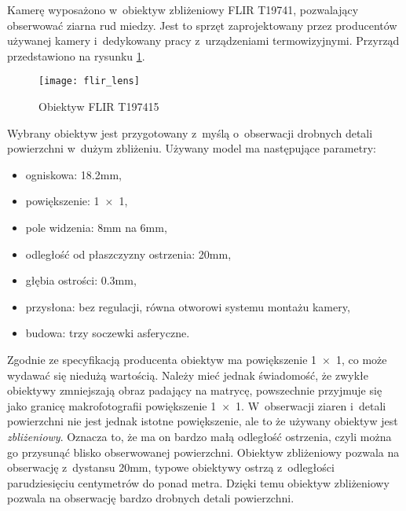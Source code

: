 Kamerę wyposażono w~obiektyw zbliżeniowy FLIR T19741, pozwalający obserwować
ziarna rud miedzy.
Jest to sprzęt zaprojektowany przez producentów używanej kamery i~dedykowany
pracy z~urządzeniami termowizyjnymi.
Przyrząd przedstawiono na rysunku \ref{fig:lens}.
\begin{figure}[htbp]
    \centering
    \texttt{[image: flir\_lens]}
    \caption{Obiektyw FLIR T197415}
    \label{fig:lens}
\end{figure}
Wybrany obiektyw jest przygotowany z~myślą o~obserwacji drobnych detali
powierzchni w~dużym zbliżeniu.
Używany model ma następujące parametry:
\begin{itemize}
	\item ogniskowa: \num{18,2}\si{\milli\meter},
	\item powiększenie: \num{1x1},
	\item pole widzenia: \num{8}\si{\milli\meter} na \num{6}\si{\milli\meter},
	\item odległość od płaszczyzny ostrzenia: \num{20}\si{\milli\meter},
	\item głębia ostrości: \num{0,3}\si{\milli\meter},
	\item przysłona: bez regulacji, równa otworowi systemu montażu kamery,
	\item budowa: trzy soczewki asferyczne.
\end{itemize}

Zgodnie ze specyfikacją producenta obiektyw ma powiększenie \num{1x1}, co może
wydawać się niedużą wartością.
Należy mieć jednak świadomość, że zwykłe obiektywy zmniejszają obraz
padający na matrycę, powszechnie przyjmuje się jako granicę makrofotografii
powiększenie \num{1x1}.
W~obserwacji ziaren i~detali powierzchni nie jest jednak istotne powiększenie,
ale to że używany obiektyw jest \emph{zbliżeniowy}.
Oznacza to, że ma on bardzo małą odległość ostrzenia, czyli można go przysunąć
blisko obserwowanej powierzchni.
Obiektyw zbliżeniowy pozwala na obserwację z~dystansu
\num{20}\si{\milli\meter}, typowe obiektywy ostrzą z~odległości parudziesięciu
centymetrów do ponad metra.
Dzięki temu obiektyw zbliżeniowy pozwala na obserwację bardzo drobnych
detali powierzchni.

